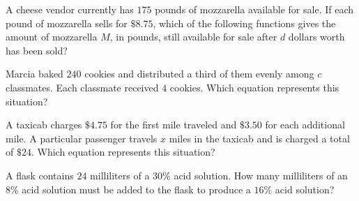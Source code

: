 \noindent\markforreview
\vspace{1em}

A cheese vendor currently has \(175\) pounds of mozzarella available for sale.  
If each pound of mozzarella sells for \(\$8.75\), which of the following functions gives the amount of mozzarella \(M\),  
in pounds, still available for sale after \(d\) dollars worth has been sold?


\vspace{2em}

\noindent\markforreview
\vspace{1em}

Marcia baked \(240\) cookies and distributed a third of them evenly among \(c\) classmates.  
Each classmate received \(4\) cookies.  
Which equation represents this situation?


\vspace{2em}

\noindent\markforreview
\vspace{1em}

A taxicab charges \(\$4.75\) for the first mile traveled and \(\$3.50\) for each additional mile.  
A particular passenger travels \(x\) miles in the taxicab and is charged a total of \(\$24\).  
Which equation represents this situation?


\vspace{2em}

\noindent\markforreview
\vspace{1em}

A flask contains \(24\) milliliters of a \(30\%\) acid solution.  
How many milliliters of an \(8\%\) acid solution must be added to the flask to produce a \(16\%\) acid solution?

\vspace{2em}

\noindent\markforreview
\vspace{1em}

